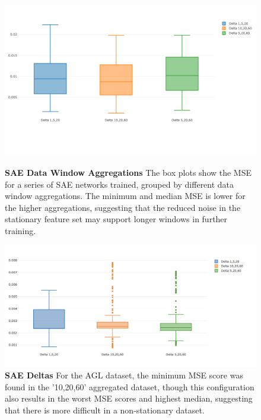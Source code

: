\documentclass[a4paper,latin]{paper}
\begin{document}
\begin{figure}[H]
	\centering
	\begin{minipage}{0.45\textwidth}
		\centering 
		\includegraphics[scale=0.3]{images/iteration_four/it4_sae_deltas.png}
		\caption{\textbf{SAE Data Window Aggregations} \newline The box plots show the MSE for a series of SAE networks trained, grouped by different data window aggregations. The minimum and median MSE is lower for the higher aggregations, suggesting that the reduced noise in the stationary feature set may support longer windows in further training.}
		\label{figure-results_sae_deltas}
	\end{minipage}\hfill
	\begin{minipage}{0.45\textwidth}
		\centering \includegraphics[scale=0.3]{images/iteration_five/it5_delta_sae.png}
		\caption{\textbf{SAE Deltas} 
			\newline For the AGL dataset, the minimum MSE score was found in the '10,20,60' aggregated dataset, though this configuration also results in the worst MSE scores and highest median, suggesting that there is more difficult in a non-stationary dataset.}
		\label{figure-it5_delta_sae}
	\end{minipage}
\end{figure}
\end{document}
